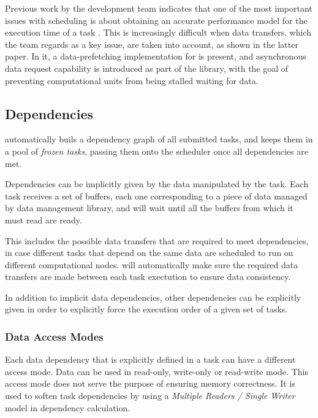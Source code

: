 \documentclass[main.tex]{subfiles}
\begin{document}
Previous work by the \starpu development team indicates that one of the most important issues with scheduling is about obtaining an accurate performance model for the execution time of a task \cite{augonnet2010data,augonnet2010automatic}. This is increasingly difficult when data transfers, which the team regards as a key issue, are taken into account, as shown in the latter paper. In it, a data-prefetching implementation for \gpus is present, and asynchronous data request capability is introduced as part of the \starpu library, with the goal of preventing computational units from being stalled waiting for data.

\subsection{Dependencies}

\starpu automatically buils a dependency graph of all submitted tasks, and keeps them in a pool of \emph{frozen tasks}, passing them onto the scheduler once all dependencies are met.

Dependencies can be implicitly given by the data manipulated by the task. Each task receives a set of buffers, each one corresponding to a piece of data managed by \starpu data management library, and will wait until all the buffers from which it must read are ready.

This includes the possible data transfers that are required to meet dependencies, in case different tasks that depend on the same data are scheduled to run on different computational nodes. \starpu will automatically make sure the required data transfers are made between each task exectution to ensure data consistency.

In addition to implicit data dependencies, other dependencies can be explicitly given in order to explicitly force the execution order of a given set of tasks.

\subsubsection{Data Access Modes} \label{sec:starpu:data_access}

Each data dependency that is explicitly defined in a task can have a different access mode. Data can be used in read-only, write-only or read-write mode. This access mode does not serve the purpose of ensuring memory correctness. It is used to soften task dependencies by using a \emph{Multiple Readers / Single Writer} model in dependency calculation.
\end{document}
